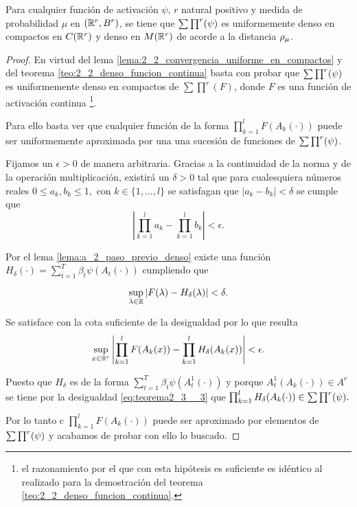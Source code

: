 \begin{teorema}
    Para cualquier función de activación $\psi$, $r$ natural positivo y
    medida de probabilidad $\mu$ en $(\mathbb{R}^r, B^r)$, 
    se tiene que $\sum \prod^r (\psi)$ es uniformemente denso en compactos
    en $C(\mathbb{R}^r)$ y denso en $M(\mathbb{R}^r)$ de acorde a la distancia $\rho_{\mu}$. 
\end{teorema}
\begin{proof}
    En virtud del lema \ref{lema:2_2_convergencia_uniforme_en_compactos} y del 
    teorema \ref{teo:2_2_denso_funcion_continua} basta con probar que 
    $\sum \prod^r (\psi)$ es uniformemente denso en compactos de $\sum \prod^r(F)$, 
    donde $F$ es una función de activación continua 
    \footnote{el razonamiento 
    por el que con esta hipótesis es suficiente es idéntico al realizado para la 
    demostración del teorema \ref{teo:2_2_denso_funcion_continua}.}.

    Para ello basta ver que cualquier función de la forma $\prod_{k=1}^l F(A_k(\cdot))$
    puede ser uniformemente aproximada por una una sucesión de funciones de $\sum \prod^r (\psi)$.

    Fijamos un $\epsilon > 0$  de manera arbitraria. 
    Gracias a la continuidad de la norma y de la operación multiplicación, existirá un $\delta >0$
    tal que para cualesquiera números reales $0 \leq a_k, b_k \leq 1,$ con $k \in \{1,...,l\}$ 
    se satisfagan que $|a_k -b_k| < \delta$ se cumple que 
    \begin{equation} \label{eq:teorema_2_3__1}
        \left| 
            \prod^l_{k=1} a_k - \prod^l_{k=1} b_k 
        \right| 
        < 
        \epsilon.
    \end{equation}

    Por el lema \ref{lema:a_2_paso_previo_denso} existe una función 
    $H_{\delta}(\cdot) = \sum_{t=1}^T \beta_t \psi(A_t(\cdot))$
    cumpliendo que 

    \begin{equation}
        \sup_{\lambda \in \mathbb{R}} |F(\lambda) - H_{\delta}(\lambda) | < \delta.
    \end{equation}

    Se satisface con la cota suficiente de la desigualdad  por lo que 
    resulta 
    \begin{equation}\label{eq:teorema2_3__3}
        \sup_{x \in \mathbb{R}^r} 
        \left| 
            \prod ^l_{k=1} F(A_k(x))
            -
            \prod ^l_{k=1} H_\delta(A_k(x))
        \right| 
        < 
        \epsilon.
    \end{equation} 
    
    Puesto que $H_\delta$ es de la forma  $\sum_{t=1}^T \beta_t \psi(A^1_t(\cdot))$ 
    y porque $A^1_t(A_k(\cdot)) \in A^r$ se tiene por la desigualdad \ref{eq:teorema2_3__3} que 
    $\prod ^l_{k=1} H_\delta(A_k(\cdot)) \in \sum \prod^r (\psi).$

    Por lo tanto c $\prod ^l_{k=1} F(A_k(\cdot))$ puede ser 
    aproximado por elementos de $\sum \prod^r (\psi)$ y acabamos de probar con ello lo buscado. 
\end{proof} 

